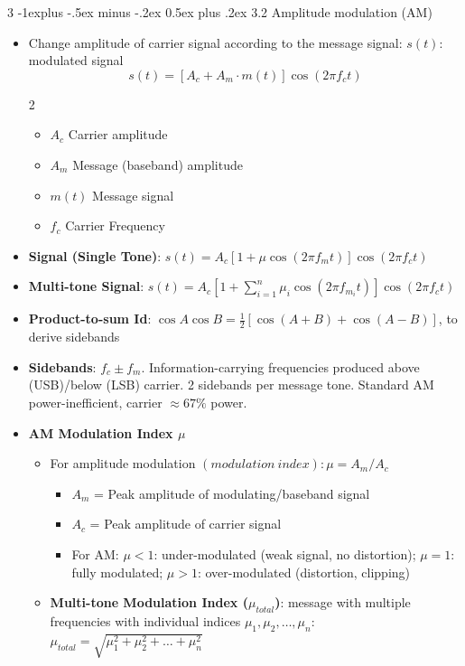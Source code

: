 \documentclass[a4paper, 9pt, landscape]{extarticle}
\makeatletter
\renewcommand{\subsection}{\@startsection{subsection}{2}{0mm}%
                                {-1explus -.5ex minus -.2ex}%
                                {0.5ex plus .2ex}%
                                {\normalfont\normalsize\bfseries}}
\makeatother
\begin{document}
\begin{multicols*}{3}
\subsection{3.2 Amplitude modulation (AM)}
\begin{itemize}
  \item Change amplitude of carrier signal according to the message signal: $s(t)$: modulated signal
      \[
        \boxed{s(t) = [A_c + A_m \cdot m(t)] \cos (2\pi f_c t)}
      \]
      \begin{multicols}{2}
        \begin{itemize} 
          \item $A_c$ Carrier amplitude
          \item $A_m$ Message (baseband) amplitude
          \item $m(t)$ Message signal
          \item $f_c$ Carrier Frequency
        \end{itemize}
    \end{multicols}
  \item \textbf{Signal (Single Tone)}: $s(t) = A_c [1 + \mu \cos(2\pi f_m t)] \cos(2\pi f_c t)$
  \item \textbf{Multi-tone Signal}: $s(t) = A_c \left[1 + \sum_{i=1}^n \mu_i \cos(2\pi f_{m_i} t)\right] \cos(2\pi f_c t)$
  \item \textbf{Product-to-sum Id}: $\cos A \cos B =  \frac{1}{2} [\cos(A+B) + \cos(A-B)]$, to derive sidebands
  \item \textbf{Sidebands}: $f_c \pm f_m$. Information-carrying frequencies produced above (USB)/below (LSB) carrier. 2 sidebands per message tone. Standard AM power-inefficient, carrier $\approx 67\%$ power.
  \item \textbf{AM Modulation Index $\mu$}
  \begin{itemize}
    \item For amplitude modulation $(modulation \ index): \mu = A_m / A_c$
    \begin{itemize}
      \item $A_m$ = Peak amplitude of modulating/baseband signal
      \item $A_c$ = Peak amplitude of carrier signal
      \item For AM: $\mu < 1$: under-modulated (weak signal, no distortion); $\mu = 1$: fully modulated; $\mu > 1$: over-modulated (distortion, clipping)
    \end{itemize}
  \item \textbf{Multi-tone Modulation Index ($\mu_{total}$)}: message with multiple frequencies with individual indices $\mu_1, \mu_2, \dots, \mu_n$: $\mu_{total} = \sqrt{\mu_1^2 + \mu_2^2 + \dots + \mu_n^2}$

\end{itemize}
\end{itemize}
\end{multicols*}
\end{document}
